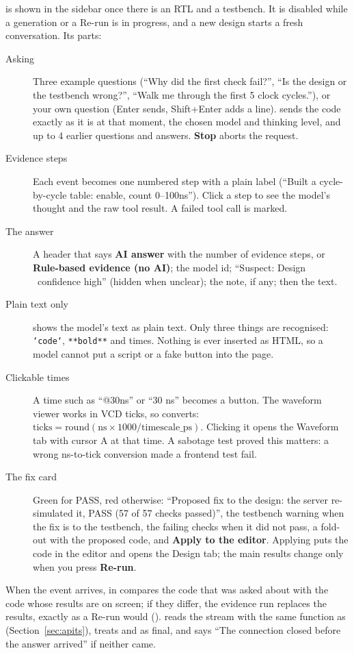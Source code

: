  is shown in the sidebar once there is an RTL and a testbench. It is disabled while a generation or a Re-run is in progress, and a new design starts a fresh conversation. Its parts:
\begin{description}
  \item[Asking] Three example questions (``Why did the first check fail?'', ``Is the design or the testbench wrong?'', ``Walk me through the first 5 clock cycles.''), or your own question (Enter sends, Shift+Enter adds a line).  sends the code exactly as it is at that moment, the chosen model and thinking level, and up to 4 earlier questions and answers. \textbf{Stop} aborts the request.
  \item[Evidence steps] Each  event becomes one numbered step with a plain label (``Built a cycle-by-cycle table: enable, count 0--100ns''). Click a step to see the model's thought and the raw tool result. A failed tool call is marked.
  \item[The answer] A header that says \textbf{AI answer} with the number of evidence steps, or \textbf{Rule-based evidence (no AI)}; the model id; ``Suspect: Design \textbullet\ confidence high'' (hidden when unclear); the note, if any; then the text.
  \item[Plain text only]  shows the model's text as plain text. Only three things are recognised: \texttt{`code`}, \texttt{**bold**} and times. Nothing is ever inserted as HTML, so a model cannot put a script or a fake button into the page.
  \item[Clickable times] A time such as ``@30ns'' or ``30 ns'' becomes a button. The waveform viewer works in VCD ticks, so  converts: $\text{ticks} = \text{round}(\text{ns} \times 1000 / \text{timescale\_ps})$. Clicking it opens the Waveform tab with cursor A at that time. A sabotage test proved this matters: a wrong ns-to-tick conversion made a frontend test fail.
  \item[The fix card] Green for PASS, red otherwise: ``Proposed fix to the design: the server re-simulated it, PASS (57 of 57 checks passed)'', the testbench warning when the fix is to the testbench, the failing checks when it did not pass, a fold-out with the proposed code, and \textbf{Apply to the editor}. Applying puts the code in the editor and opens the Design tab; the main results change only when you press \textbf{Re-run}.
\end{description}

When the  event arrives,  in  compares the code that was asked about with the code whose results are on screen; if they differ, the evidence run replaces the results, exactly as a Re-run would ().  reads the stream with the same  function as  (Section~\ref{sec:apits}), treats  and  as final, and says ``The connection closed before the answer arrived'' if neither came.

